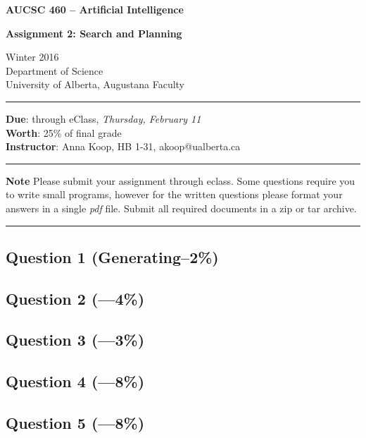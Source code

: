 \documentclass[12pt]{article}
\begin{document}
\noindent
{\Large\bf AUCSC 460 -- Artificial Intelligence}

\vspace*{1\baselineskip}

\noindent
{\large\bf Assignment 2: Search and Planning}

\vspace*{1\baselineskip}

\noindent
Winter 2016\\
Department of Science\\
University of Alberta, Augustana Faculty

\vspace*{1.75\baselineskip}
\hrule

\vspace*{0.75\baselineskip}

\noindent
{\bf Due}: through eClass, {\em Thursday, February 11}\\
{\bf Worth}: 25\% of final grade
\\
{\bf Instructor}: Anna Koop, HB 1-31, akoop@ualberta.ca

\vspace*{0.75\baselineskip}

\hrule

\vspace*{1\baselineskip}

\noindent
{\bf Note}
Please submit your assignment through eclass. Some questions require you to write small programs,
however for the written questions please format your answers
in a single {\em pdf\/} file.
Submit all required documents in a zip or tar archive.


\vspace*{1\baselineskip}

\hrule


\subsection*{Question 1 \rm(Generating--2\%)}


\subsection*{Question 2 \rm(---4\%)}

\subsection*{Question 3 \rm(---3\%)}

\subsection*{Question 4 \rm(---8\%)}

\subsection*{Question 5 \rm(---8\%)}
\end{document}
